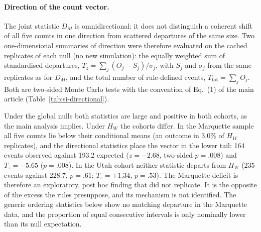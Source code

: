 \documentclass[12pt]{article}
\newcommand{\HW}{H_{W}}
\newcommand{\DM}{D_{M}}
\begin{document}
\paragraph{Direction of the count vector.} The joint statistic $\DM$ is omnidirectional:
it does not distinguish a coherent shift of all five counts in one direction from
scattered departures of the same size. Two one-dimensional summaries of direction were
therefore evaluated on the cached replicates of each null (no new simulation): the
equally weighted sum of standardised departures, $T_z = \sum_j (O_j - \bar S_j)/\sigma_j$,
with $\bar S_j$ and $\sigma_j$ from the same replicates as for $\DM$, and the total number of
rule-defined events, $T_{\mathrm{tot}} = \sum_j O_j$. Both are two-sided Monte Carlo tests
with the convention of Eq.~(1) of the main article (Table~\ref{tab:si-directional}).

Under the global nulls both statistics are large and positive in both cohorts, as the
main analysis implies. Under $\HW$ the cohorts differ. In the Marquette sample all five
counts lie below their conditional means (an outcome in $3.0\%$ of $\HW$ replicates), and
the directional statistics place the vector in the lower tail: 164 events observed against
193.2 expected ($z = -2.68$, two-sided $p = .008$) and $T_z = -5.65$ ($p = .008$). In the
Utah cohort neither statistic departs from $\HW$ (235 events against 228.7, $p = .61$;
$T_z = +1.34$, $p = .53$). The Marquette deficit is therefore an exploratory, post hoc
finding that did not replicate. It is the opposite of the excess the rules presuppose, and
its mechanism is not identified. The generic ordering statistics below show no matching
departure in the Marquette data, and the proportion of equal consecutive intervals is only
nominally lower than its null expectation.
\end{document}
